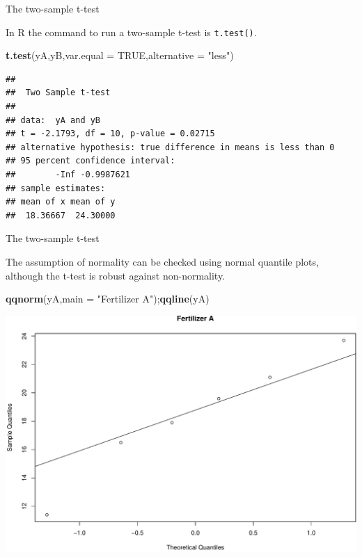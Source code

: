 \documentclass[9pt,ignorenonframetext,]{beamer}
\newenvironment{Shaded}{\begin{snugshade}}{\end{snugshade}}
\newcommand{\KeywordTok}[1]{\textcolor[rgb]{0.13,0.29,0.53}{\textbf{{#1}}}}
\newcommand{\DataTypeTok}[1]{\textcolor[rgb]{0.13,0.29,0.53}{{#1}}}
\newcommand{\StringTok}[1]{\textcolor[rgb]{0.31,0.60,0.02}{{#1}}}
\newcommand{\OtherTok}[1]{\textcolor[rgb]{0.56,0.35,0.01}{{#1}}}
\newcommand{\NormalTok}[1]{{#1}}
\begin{document}
\begin{frame}[fragile]{The two-sample t-test}

In R the command to run a two-sample t-test is \texttt{t.test()}.

\begin{Shaded}
\begin{Highlighting}[]
\KeywordTok{t.test}\NormalTok{(yA,yB,}\DataTypeTok{var.equal =} \OtherTok{TRUE}\NormalTok{,}\DataTypeTok{alternative =} \StringTok{"less"}\NormalTok{)}
\end{Highlighting}
\end{Shaded}

\begin{verbatim}
## 
##  Two Sample t-test
## 
## data:  yA and yB
## t = -2.1793, df = 10, p-value = 0.02715
## alternative hypothesis: true difference in means is less than 0
## 95 percent confidence interval:
##        -Inf -0.9987621
## sample estimates:
## mean of x mean of y 
##  18.36667  24.30000
\end{verbatim}

\end{frame}

\begin{frame}[fragile]{The two-sample t-test}

The assumption of normality can be checked using normal quantile plots,
although the t-test is robust against non-normality.

\begin{Shaded}
\begin{Highlighting}[]
\KeywordTok{qqnorm}\NormalTok{(yA,}\DataTypeTok{main =} \StringTok{"Fertilizer A"}\NormalTok{);}\KeywordTok{qqline}\NormalTok{(yA)}
\end{Highlighting}
\end{Shaded}

\includegraphics{class4slides-jan18_files/figure-beamer/unnamed-chunk-16-1.pdf}

\end{frame}
\end{document}
